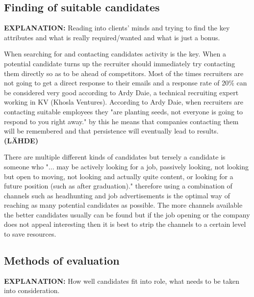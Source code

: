 \documentclass[11pt,a4paper,oneside,article]{memoir}
\begin{document}

\subsection{Finding of suitable candidates}
\textbf{EXPLANATION:} Reading into clients’ minds and trying to find the key attributes and what is really required/wanted and what is just a bonus. 


When searching for and contacting candidates activity is the key. When a potential candidate turns up the recruiter should immediately try contacting them directly so as to be ahead of competitors. Most of the times recruiters are not going to get a direct response to their emails and a response rate of 20\% can be considered very good according to Ardy Daie, a technical recruiting expert working in KV (Khosla Ventures). According to Ardy Daie, when recruiters are contacting suitable employees they "are planting seeds, not everyone is going to respond to you right away." by this he means that companies contacting them will be remembered and that persistence will eventually lead to results. \textbf{(LÄHDE)}

There are multiple different kinds of candidates but tersely a candidate is someone who "... may be actively looking for a job, passively looking, not looking but open to moving, not looking and actually quite content, or looking for a future position (such as after graduation)." \cite[p.~24]{mcculler:book} therefore using a combination of channels such as headhunting and job advertisements is the optimal way of reaching as many potential candidates as possible. The more channels available the better candidates usually can be found but if the job opening or the company does not appeal interesting then it is best to strip the channels to a certain level to save resources.



\subsection{Methods of evaluation}
\textbf{EXPLANATION:} How well candidates fit into role, what needs to be taken into consideration.
\end{document}
